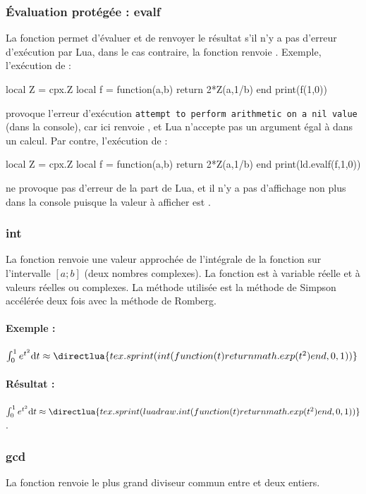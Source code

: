 \subsubsection{Évaluation protégée : evalf}
La fonction  permet d'évaluer  et de renvoyer le résultat s'il n'y a pas d'erreur d'exécution par Lua, dans le cas contraire, la fonction renvoie \nil. Exemple, l'exécution de :
\begin{Luacode}
local Z = cpx.Z
local f = function(a,b)
    return 2*Z(a,1/b)
end
print(f(1,0))
\end{Luacode}
provoque l'erreur d'exécution \verb|attempt to perform arithmetic on a nil value| (dans la console), car ici  renvoie \nil, et Lua n'accepte pas un argument égal à \nil dans un calcul. Par contre, l'exécution de :
\begin{Luacode}
local Z = cpx.Z
local f = function(a,b)
    return 2*Z(a,1/b)
end
print(ld.evalf(f,1,0))
\end{Luacode}
ne provoque pas d'erreur de la part de Lua, et il n'y a pas d'affichage non plus dans la console puisque la valeur à afficher est \nil.

\subsubsection{int}
La fonction  renvoie une valeur approchée de l'intégrale de la fonction  sur l'intervalle $[a;b]$ (deux nombres complexes). La fonction  est à variable réelle et à valeurs réelles ou complexes. La méthode utilisée est la méthode de Simpson accélérée deux fois avec la méthode de Romberg.

\paragraph{Exemple :}
\begin{TeXcode}
$\int_0^1 e^{t^2}\mathrm d t \approx \directlua{tex.sprint(int(function(t) return math.exp(t^2) end, 0, 1))}$
\end{TeXcode}
\paragraph{Résultat :} $\int_0^1 e^{t^2}\mathrm d t \approx \directlua{tex.sprint(luadraw.int(function(t) return math.exp(t^2) end, 0, 1))}$.

\subsubsection{gcd}
La fonction  renvoie le plus grand diviseur commun entre  et  deux entiers.

